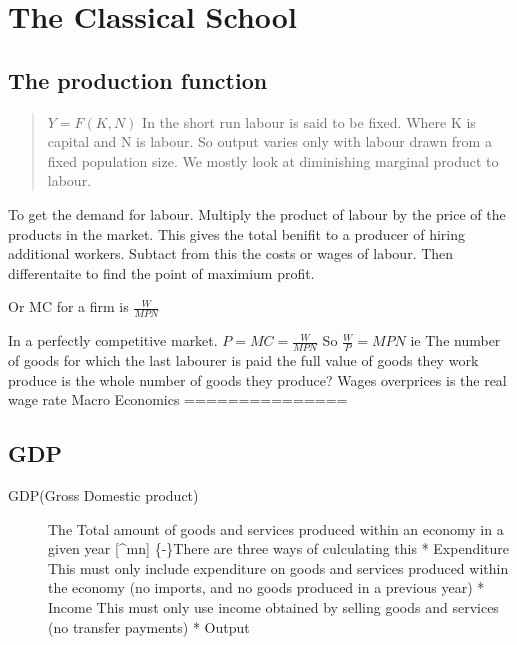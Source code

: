 \documentclass[twocolumn]{article}
\date{}
\begin{document}
\hypertarget{the-classical-school}{%
\section{The Classical School}\label{the-classical-school}}

\hypertarget{the-production-function}{%
\subsection{The production function}\label{the-production-function}}

\begin{quote}
\(Y=F(K,N)\) In the short run labour is said to be fixed. Where K is
capital and N is labour. So output varies only with labour drawn from a
fixed population size. We mostly look at diminishing marginal product to
labour.
\end{quote}

To get the demand for labour. Multiply the product of labour by the
price of the products in the market. This gives the total benifit to a
producer of hiring additional workers. Subtact from this the costs or
wages of labour. Then differentaite to find the point of maximium
profit.

Or MC for a firm is \(\frac{W}{MPN}\)

In a perfectly competitive market. \(P=MC=\frac{W}{MPN}\) So
\(\frac{W}{P} = MPN\) ie The number of goods for which the last labourer
is paid the full value of goods they work produce is the whole number of
goods they produce? Wages overprices is the real wage rate Macro
Economics ===============

\hypertarget{gdp}{%
\subsection{GDP}\label{gdp}}

\begin{description}
\item[GDP(Gross Domestic product)]
The Total amount of goods and services produced within an economy in a
given year {[}\^{}mn{]} \{-\}There are three ways of culculating this *
Expenditure This must only include expenditure on goods and services
produced within the economy (no imports, and no goods produced in a
previous year) * Income This must only use income obtained by selling
goods and services (no transfer payments) * Output
\end{description}
\end{document}
